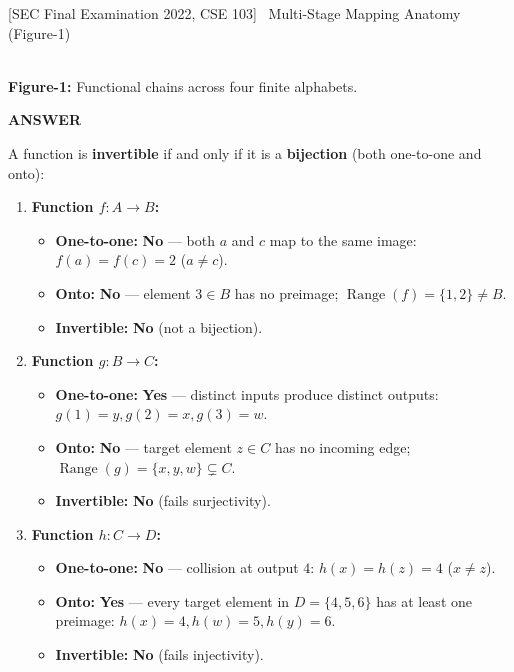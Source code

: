 \documentclass[11pt,a4paper]{article}
\newcommand{\Alabel}{\textbf{\color{teal}\footnotesize\MakeUppercase{Answer}}\par\smallskip}
\begin{document}
\begin{exambox}{[SEC Final Examination 2022, CSE 103] \ Multi-Stage Mapping Anatomy (Figure-1)}
\begin{center}
\\[2pt]
{\footnotesize\textbf{Figure-1:} Functional chains across four finite alphabets.}
\end{center}
\tcblower
\Alabel
A function is \textbf{invertible} if and only if it is a \textbf{bijection} (both one-to-one and onto):
\begin{enumerate}
    \item \textbf{Function $f\colon A\to B$:}
    \begin{itemize}
        \item \textbf{One-to-one:} \textbf{No} --- both $a$ and $c$ map to the same image: $f(a) = f(c) = 2$ ($a \neq c$).
        \item \textbf{Onto:} \textbf{No} --- element $3 \in B$ has no preimage; $\operatorname{Range}(f) = \{1, 2\} \neq B$.
        \item \textbf{Invertible:} \textbf{No} (not a bijection).
    \end{itemize}
    \item \textbf{Function $g\colon B\to C$:}
    \begin{itemize}
        \item \textbf{One-to-one:} \textbf{Yes} --- distinct inputs produce distinct outputs: $g(1)=y, g(2)=x, g(3)=w$.
        \item \textbf{Onto:} \textbf{No} --- target element $z \in C$ has no incoming edge; $\operatorname{Range}(g) = \{x, y, w\} \subsetneq C$.
        \item \textbf{Invertible:} \textbf{No} (fails surjectivity).
    \end{itemize}
    \item \textbf{Function $h\colon C\to D$:}
    \begin{itemize}
        \item \textbf{One-to-one:} \textbf{No} --- collision at output $4$: $h(x) = h(z) = 4$ ($x \neq z$).
        \item \textbf{Onto:} \textbf{Yes} --- every target element in $D=\{4,5,6\}$ has at least one preimage: $h(x)=4, h(w)=5, h(y)=6$.
        \item \textbf{Invertible:} \textbf{No} (fails injectivity).
    \end{itemize}
\end{enumerate}
\end{exambox}
\end{document}
